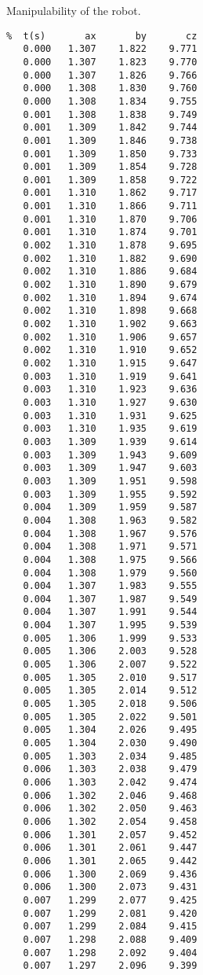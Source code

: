 Manipulability of the robot.
 \pagebreak[1]\begin{verbatim}
%  t(s)       ax       by       cz
   0.000   1.307    1.822    9.771
   0.000   1.307    1.823    9.770
   0.000   1.307    1.826    9.766
   0.000   1.308    1.830    9.760
   0.000   1.308    1.834    9.755
   0.001   1.308    1.838    9.749
   0.001   1.309    1.842    9.744
   0.001   1.309    1.846    9.738
   0.001   1.309    1.850    9.733
   0.001   1.309    1.854    9.728
   0.001   1.309    1.858    9.722
   0.001   1.310    1.862    9.717
   0.001   1.310    1.866    9.711
   0.001   1.310    1.870    9.706
   0.001   1.310    1.874    9.701
   0.002   1.310    1.878    9.695
   0.002   1.310    1.882    9.690
   0.002   1.310    1.886    9.684
   0.002   1.310    1.890    9.679
   0.002   1.310    1.894    9.674
   0.002   1.310    1.898    9.668
   0.002   1.310    1.902    9.663
   0.002   1.310    1.906    9.657
   0.002   1.310    1.910    9.652
   0.002   1.310    1.915    9.647
   0.003   1.310    1.919    9.641
   0.003   1.310    1.923    9.636
   0.003   1.310    1.927    9.630
   0.003   1.310    1.931    9.625
   0.003   1.310    1.935    9.619
   0.003   1.309    1.939    9.614
   0.003   1.309    1.943    9.609
   0.003   1.309    1.947    9.603
   0.003   1.309    1.951    9.598
   0.003   1.309    1.955    9.592
   0.004   1.309    1.959    9.587
   0.004   1.308    1.963    9.582
   0.004   1.308    1.967    9.576
   0.004   1.308    1.971    9.571
   0.004   1.308    1.975    9.566
   0.004   1.308    1.979    9.560
   0.004   1.307    1.983    9.555
   0.004   1.307    1.987    9.549
   0.004   1.307    1.991    9.544
   0.004   1.307    1.995    9.539
   0.005   1.306    1.999    9.533
   0.005   1.306    2.003    9.528
   0.005   1.306    2.007    9.522
   0.005   1.305    2.010    9.517
   0.005   1.305    2.014    9.512
   0.005   1.305    2.018    9.506
   0.005   1.305    2.022    9.501
   0.005   1.304    2.026    9.495
   0.005   1.304    2.030    9.490
   0.005   1.303    2.034    9.485
   0.006   1.303    2.038    9.479
   0.006   1.303    2.042    9.474
   0.006   1.302    2.046    9.468
   0.006   1.302    2.050    9.463
   0.006   1.302    2.054    9.458
   0.006   1.301    2.057    9.452
   0.006   1.301    2.061    9.447
   0.006   1.301    2.065    9.442
   0.006   1.300    2.069    9.436
   0.006   1.300    2.073    9.431
   0.007   1.299    2.077    9.425
   0.007   1.299    2.081    9.420
   0.007   1.299    2.084    9.415
   0.007   1.298    2.088    9.409
   0.007   1.298    2.092    9.404
   0.007   1.297    2.096    9.399

\end{verbatim}
